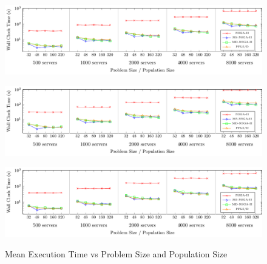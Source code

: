 \begin{figure}[t]
    \begin{minipage}{\textwidth}
        \hspace*{-2.1em}
        \includegraphics[width=1.05\textwidth]{figures/graphs/fat_tree_timing}
        \vspace{1em}

        \label{fig:ft_tm}
    \end{minipage}

    \begin{minipage}{\textwidth}
        \hspace*{-2.1em}
        \includegraphics[width=1.05\textwidth]{figures/graphs/dcell_timing}
        \vspace{1em}

        \label{fig:dc_tm}
    \end{minipage}

    \begin{minipage}{\textwidth}
        \hspace*{-2.1em}
        \includegraphics[width=1.05\textwidth]{figures/graphs/leaf_spine_timing}
        \vspace{1em}

        \label{fig:ls_tm}
    \end{minipage}

    \caption{Mean Execution Time vs Problem Size and Population Size}
    \label{fig:et}
\end{figure}

